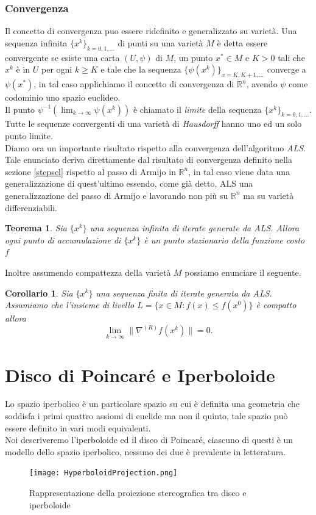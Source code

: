 \documentclass[a4paper, 12pt]{article}
\newtheorem{theorem}{Teorema}
\newtheorem{corollary}{Corollario}
\begin{document}
\subsubsection{Convergenza}
Il concetto di convergenza puo essere ridefinito e generalizzato su varietà. Una sequenza infinita $\{x^k\}_{k=0,1,...}$ di punti su una varietà $M$ è detta essere convergente se esiste una carta $(U, \psi)$ di $M$, un punto $x^\ast \in M$ e $K > 0$ tali che $x^k$ è in $U$ per ogni $k \geq K$ e tale che la sequenza $\{\psi(x^k)\}_{x=K, K+1, ...}$ converge a $\psi(x^\ast)$, in tal caso applichiamo il concetto di convergenza di $\mathbb{R}^n$, avendo $\psi$ come codominio uno spazio euclideo.\\
Il punto $\psi^{-1}(\lim_{k \to \infty} \psi(x^k))$ è chiamato il \emph{limite} della sequenza $\{x^k\}_{k=0,1,...}$.\\
Tutte le sequenze convergenti di una varietà di \emph{Hausdorff} hanno uno ed un solo punto limite.\\
Diamo ora un importante risultato rispetto alla convergenza dell'algoritmo \emph{ALS}.\\
Tale enunciato deriva direttamente dal risultato di convergenza definito nella sezione \ref{stepsel} rispetto al passo di Armijo in $\mathbb{R}^n$, in tal caso viene data una generalizzazione di quest'ultimo essendo, come già detto, ALS una generalizzazione del passo di Armijo e lavorando non più su $\mathbb{R}^n$ ma su varietà differenziabili.
\begin{theorem}
Sia $\{x^k\}$ una sequenza infinita di iterate generate da ALS. Allora ogni punto di accumulazione  di $\{x^k\}$ è un punto stazionario della funzione costo $f$
\end{theorem}
Inoltre assumendo compattezza della varietà $M$ possiamo enunciare il seguente.
\begin{corollary}
Sia $\{x^k\}$ una sequenza finita di iterate generata da ALS. Assumiamo che l'insieme di livello $L = \{x \in M : f(x) \leq f(x^0)\}$ è compatto allora\\
\[\lim_{k \to \infty} \| \nabla^{(R)} f(x^k) \| = 0.\]
\end{corollary}

\section{Disco di Poincaré e Iperboloide}
Lo spazio iperbolico è un particolare spazio su cui è definita una geometria che soddisfa i primi quattro assiomi di euclide ma non il quinto, tale spazio può essere definito in vari modi equivalenti.\\
Noi descriveremo l'iperboloide ed il disco di Poincaré, ciascuno di questi è un modello dello spazio iperbolico, nessuno dei due è prevalente in letteratura.\\
\begin{figure}[t] %
    \centering\texttt{[image: HyperboloidProjection.png]}
    \caption{Rappresentazione della proiezione stereografica tra disco e iperboloide}
\end{figure}
\end{document}
